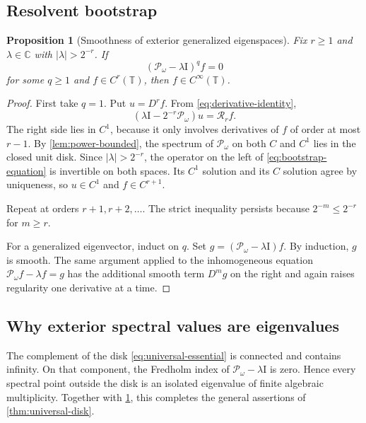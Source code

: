 \documentclass[11pt,a4paper]{article}
\newtheorem{proposition}[theorem]{Proposition}
\theoremstyle{definition}
\theoremstyle{remark}
\newcommand{\C}{\mathbb C}
\newcommand{\T}{\mathbb T}
\newcommand{\Pop}{\mathcal P}
\newcommand{\id}{\mathrm I}
\begin{document}
\subsection{Resolvent bootstrap}
\begin{proposition}[Smoothness of exterior generalized eigenspaces]
\label{prop:smooth-bootstrap}
Fix $r\ge1$ and $\lambda\in\C$ with $|\lambda|>2^{-r}$.  If
\begin{equation}
 (\Pop_\omega-\lambda\id)^qf=0
 \label{eq:generalized-equation}
\end{equation}
for some $q\ge1$ and $f\in C^r(\T)$, then $f\in C^\infty(\T)$.
\end{proposition}
\begin{proof}
First take $q=1$.  Put $u=D^rf$.  From
\eqref{eq:derivative-identity},
\begin{equation}
 (\lambda\id-2^{-r}\Pop_\omega)u=\mathcal R_rf.
 \label{eq:bootstrap-equation}
\end{equation}
The right side lies in $C^1$, because it only involves derivatives of $f$ of
order at most $r-1$.  By \cref{lem:power-bounded}, the spectrum of
$\Pop_\omega$ on both $C$ and $C^1$ lies in the closed unit disk.  Since
$|\lambda|>2^{-r}$, the operator on the left of
\eqref{eq:bootstrap-equation} is invertible on both spaces.  Its $C^1$
solution and its $C$ solution agree by uniqueness, so $u\in C^1$ and
$f\in C^{r+1}$.

Repeat at orders $r+1,r+2,\ldots$.  The strict inequality persists because
$2^{-m}\le2^{-r}$ for $m\ge r$.

For a generalized eigenvector, induct on $q$.  Set
$g=(\Pop_\omega-\lambda\id)f$.  By induction, $g$ is smooth.  The same
argument applied to the inhomogeneous equation
$\Pop_\omega f-\lambda f=g$ has the additional smooth term $D^mg$ on the
right and again raises regularity one derivative at a time.
\end{proof}

\subsection{Why exterior spectral values are eigenvalues}
The complement of the disk \eqref{eq:universal-essential} is connected and
contains infinity.  On that component, the Fredholm index of
$\Pop_\omega-\lambda\id$ is zero.  Hence every spectral point outside the
disk is an isolated eigenvalue of finite algebraic multiplicity.  Together
with \cref{prop:smooth-bootstrap}, this completes the general assertions of
\cref{thm:universal-disk}.
\end{document}
